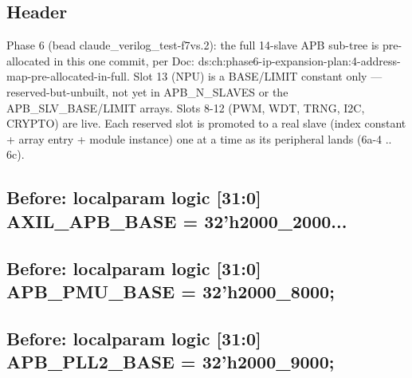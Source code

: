 \begin{record}

\subsection*{Header}

\begin{textblock}
Phase 6 (bead claude_verilog_test-f7vs.2): the full 14-slave APB sub-tree is
pre-allocated in this one commit, per Doc: ds:ch:phase6-ip-expansion-plan:4-address-map-pre-allocated-in-full.
Slot 13 (NPU) is a BASE/LIMIT constant only —
reserved-but-unbuilt, not yet in APB_N_SLAVES or the APB_SLV_BASE/LIMIT
arrays. Slots 8-12 (PWM, WDT, TRNG, I2C, CRYPTO) are live. Each reserved slot is promoted to a
real slave (index constant + array entry + module instance) one at a time as
its peripheral lands (6a-4 .. 6c).
\end{textblock}

\subsection*{Before: localparam logic [31:0] AXIL\_APB\_BASE    = 32'h2000\_2000...}


\subsection*{Before: localparam logic [31:0] APB\_PMU\_BASE    = 32'h2000\_8000;}


\subsection*{Before: localparam logic [31:0] APB\_PLL2\_BASE   = 32'h2000\_9000;}


\end{record}

